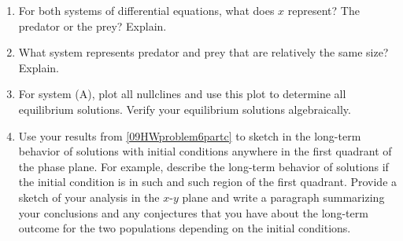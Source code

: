 \begin{enumerate}
\begin{enumerate}
\item For both systems of differential equations, what does $x$ represent? The predator or the prey? Explain. \label{09HWproblem6parta}
\item	What system represents predator and prey that are relatively the same size? Explain. \label{09HWproblem6partb}
\item	For system (A), plot all nullclines and use this plot to determine all equilibrium solutions. Verify your equilibrium solutions algebraically.\label{09HWproblem6partc}
\item	Use your results from \ref{09HWproblem6partc} to sketch in the long-term behavior of solutions with initial conditions anywhere in the first quadrant of the phase plane. For example, describe the long-term behavior of solutions if the initial condition is in such and such region of the first quadrant. Provide a sketch of your analysis in the $x$-$y$ plane and write a paragraph summarizing your conclusions and any conjectures that you have about the long-term outcome for the two populations depending on the initial conditions. \label{09HWproblem6partd}
\end{enumerate}

\clearpage


\end{enumerate}
